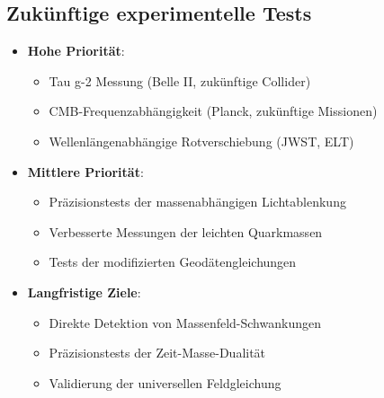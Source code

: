 \documentclass[12pt,a4paper]{article}
\begin{document}
\subsection{Zukünftige experimentelle Tests}
\begin{itemize}
	\item \textbf{Hohe Priorität}: 
	\begin{itemize}
		\item Tau g-2 Messung (Belle II, zukünftige Collider)
		\item CMB-Frequenzabhängigkeit (Planck, zukünftige Missionen)
		\item Wellenlängenabhängige Rotverschiebung (JWST, ELT)
	\end{itemize}
	
	\item \textbf{Mittlere Priorität}:
	\begin{itemize}
		\item Präzisionstests der massenabhängigen Lichtablenkung
		\item Verbesserte Messungen der leichten Quarkmassen
		\item Tests der modifizierten Geodätengleichungen
	\end{itemize}
	
	\item \textbf{Langfristige Ziele}:
	\begin{itemize}
		\item Direkte Detektion von Massenfeld-Schwankungen
		\item Präzisionstests der Zeit-Masse-Dualität
		\item Validierung der universellen Feldgleichung
	\end{itemize}
\end{itemize}
\end{document}
